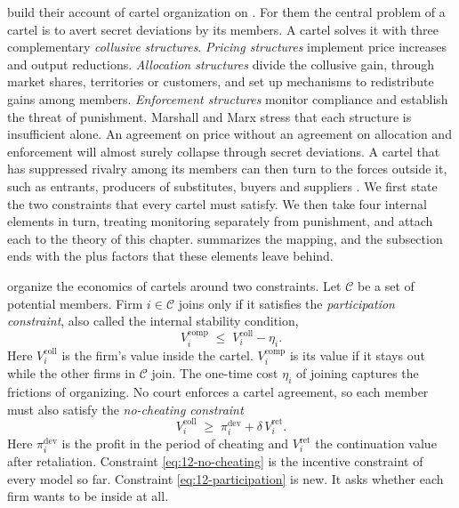 \citet[pp.~105--108]{MarshallMarx2012} build their account of cartel organization on \citet{Stigler1964}. For them
the central problem of a cartel is to avert secret deviations by its members. A cartel solves it with three
complementary \emph{collusive structures}. \emph{Pricing structures} implement price increases and output
reductions. \emph{Allocation structures} divide the collusive gain, through market shares, territories or customers,
and set up mechanisms to redistribute gains among members. \emph{Enforcement structures} monitor compliance and
establish the threat of punishment. Marshall and Marx stress that each structure is insufficient alone. An agreement
on price without an agreement on allocation and enforcement will almost surely collapse through secret deviations.
A cartel that has suppressed rivalry among its members can then turn to the forces outside it, such as entrants,
producers of substitutes, buyers and suppliers \citep[pp.~143--144]{MarshallMarx2012}. We first state the two
constraints that every cartel must satisfy. We then take four internal elements in turn, treating monitoring
separately from punishment, and attach each to the theory of this chapter.  summarizes
the mapping, and the subsection ends with the plus factors that these elements leave behind.

\citet[pp.~187--188]{AskerNocke2021} organize the economics of cartels around two constraints. Let $\mathcal C$ be a
set of potential members. Firm $i \in \mathcal C$ joins only if it satisfies the \emph{participation constraint}, also
called the internal stability condition,
\begin{equation}\label{eq:12-participation}
V_i^{\mathrm{comp}} \;\le\; V_i^{\mathrm{coll}} - \eta_i .
\end{equation}
Here $V_i^{\mathrm{coll}}$ is the firm's value inside the cartel. $V_i^{\mathrm{comp}}$ is its value if it stays out
while the other firms in $\mathcal C$ join. The one-time cost $\eta_i$ of joining captures the frictions of organizing.
No court enforces a cartel agreement, so each member must also satisfy the \emph{no-cheating constraint}
\begin{equation}\label{eq:12-no-cheating}
V_i^{\mathrm{coll}} \;\ge\; \pi_i^{\mathrm{dev}} + \delta\,V_i^{\mathrm{ret}} .
\end{equation}
Here $\pi_i^{\mathrm{dev}}$ is the profit in the period of cheating and $V_i^{\mathrm{ret}}$ the continuation value
after retaliation. Constraint \eqref{eq:12-no-cheating} is the incentive constraint of every model so far.
Constraint \eqref{eq:12-participation} is new. It asks whether each firm wants to be inside at all.


